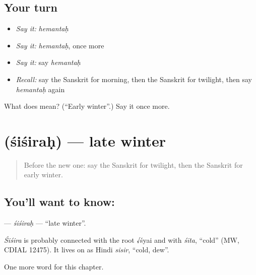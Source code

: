 \subsection*{Your turn}
\begin{itemize}
\raggedright
  \item \emph{Say it:} \emph{hemantaḥ}
  \item \emph{Say it:} \emph{hemantaḥ}, once more
  \item \emph{Say it:} say \emph{hemantaḥ}
  \item \emph{Recall:} say the Sanskrit for morning, then the Sanskrit for twilight, then say \emph{hemantaḥ} again
\end{itemize}

\begin{tcolorbox}[breakable,colback=teal!4,colframe=teal!35!black,title={Before you move on}]
What does  mean? (\textquotedblleft{}Early winter\textquotedblright{}.) Say it once more.
\end{tcolorbox}
\section[\texorpdfstring{\sk{शिशिरः} (śiśiraḥ)}{शिशिरः (śiśiraḥ)}]{ (śiśiraḥ) — late winter}

\label{lesson:SA-C91-sisirah}



\begin{quote}
Before the new one: say the Sanskrit for twilight, then the Sanskrit for early winter.
\end{quote}

\subsection*{You'll want to know: }
\textbf{} — \emph{śiśiraḥ} — \textquotedblleft{}late winter\textquotedblright{}.

\begin{cousinweb}
\emph{Śiśira} is probably connected with the root √śyai and with \emph{śīta}, \textquotedblleft{}cold\textquotedblright{} (MW, CDIAL 12475). It lives on as Hindi \emph{sisir}, \textquotedblleft{}cold, dew\textquotedblright{}.
\end{cousinweb}

\begin{grammarlens}[title={What you've built}]
One more word for this chapter.
\end{grammarlens}

